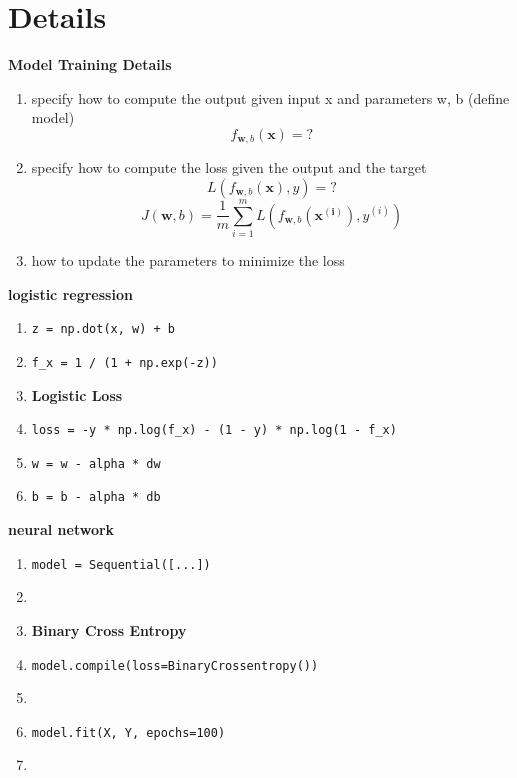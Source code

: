 \section{Details}
\textbf{Model Training Details}
\begin{enumerate}
    \item specify how to compute the output given input x and parameters w, b (define model)
    \[f_{\mathbf{w}, b}(\mathbf{x})=?\]
    \item specify how to compute the loss given the output and the target
    \[L(f_{\mathbf{w}, b}(\mathbf{x}), y) = ?\]
    \[J(\mathbf{w}, b) = \frac{1}{m}\sum_{i=1}^{m}L(f_{\mathbf{w}, b}(\mathbf{x^{(i)}}), y^{(i)})\]
    \item how to update the parameters to minimize the loss
\end{enumerate}
\vspace{2em}
\begin{notebox}
\begin{minipage}{0.45\textwidth}
    \begin{center}
    \textbf{logistic regression}
    \end{center}
    \begin{enumerate}
        \item \texttt{z = np.dot(x, w) + b}
        \item[] \texttt{f\_x = 1 / (1 + np.exp(-z))}
        \item \textbf{Logistic Loss}
        \item[] \texttt{loss = -y * np.log(f\_x) - (1 - y) * np.log(1 - f\_x)}
        \item \texttt{w = w - alpha * dw}
        \item[] \texttt{b = b - alpha * db}
    \end{enumerate}
\end{minipage}
\vrule{}
\begin{minipage}{0.45\textwidth}
    \begin{center}
    \textbf{neural network}
    \end{center}
    \begin{enumerate}
        \item \texttt{model = Sequential([...])}
        \item[] 
        \item \textbf{Binary Cross Entropy}
        \item[] \texttt{model.compile(loss=BinaryCrossentropy())}
        \item[] 
        \item \texttt{model.fit(X, Y, epochs=100)}
        \item[]
    \end{enumerate}
\end{minipage}
\end{notebox}

